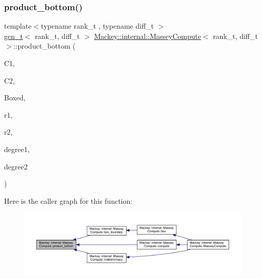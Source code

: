 \subsubsection{\texorpdfstring{product\+\_\+bottom()}{product\_bottom()}\hspace{0.1cm}{\footnotesize\ttfamily [1/2]}}
{\footnotesize\ttfamily template$<$typename rank\+\_\+t , typename diff\+\_\+t $>$ \\
\hyperlink{namespaceMackey_a6bb0b2796632ba6c7f8ea192f7aecffe}{gen\+\_\+t}$<$ rank\+\_\+t, diff\+\_\+t $>$ \hyperlink{structMackey_1_1internal_1_1MasseyCompute}{Mackey\+::internal\+::\+Massey\+Compute}$<$ rank\+\_\+t, diff\+\_\+t $>$\+::product\+\_\+bottom (\begin{DoxyParamCaption}\item[{const \hyperlink{classMackey_1_1Chains}{Chains}$<$ rank\+\_\+t, diff\+\_\+t $>$ \&}]{C1,  }\item[{const \hyperlink{classMackey_1_1Chains}{Chains}$<$ rank\+\_\+t, diff\+\_\+t $>$ \&}]{C2,  }\item[{const \hyperlink{classMackey_1_1JunctionBox}{Junction\+Box}$<$ rank\+\_\+t, diff\+\_\+t $>$ \&}]{Boxed,  }\item[{const \hyperlink{namespaceMackey_a6bb0b2796632ba6c7f8ea192f7aecffe}{gen\+\_\+t}$<$ rank\+\_\+t, diff\+\_\+t $>$ \&}]{r1,  }\item[{const \hyperlink{namespaceMackey_a6bb0b2796632ba6c7f8ea192f7aecffe}{gen\+\_\+t}$<$ rank\+\_\+t, diff\+\_\+t $>$ \&}]{r2,  }\item[{int}]{degree1,  }\item[{int}]{degree2 }\end{DoxyParamCaption})}

Here is the caller graph for this function\+:\nopagebreak
\begin{figure}[H]
\begin{center}
\leavevmode
\includegraphics[width=350pt]{structMackey_1_1internal_1_1MasseyCompute_a2a7ff03cfeadb4f35c0798bf2a447a7e_icgraph}
\end{center}
\end{figure}
\mbox{\label{structMackey_1_1internal_1_1MasseyCompute_a365bc6ba5037727f1ce3d0a1e469f408}} 
